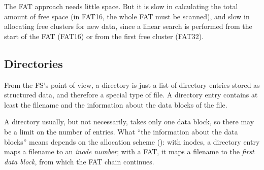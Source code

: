 The FAT approach needs little space. But it is slow in calculating the total amount of free space (in FAT16, the whole FAT must be scanned), and slow in allocating free clusters for new data, since a linear search is performed from the start of the FAT (FAT16) or from the first free cluster (FAT32).

\subsection{Directories}

\begin{definition}
  From the FS's point of view, a directory is just a list of directory entries stored as structured data, and therefore a special type of file. A directory entry contains at least the filename and the information about the data blocks of the file.
\end{definition}

A directory usually, but not necessarily, takes only one data block, so there may be a limit on the number of entries. What ``the information about the data blocks'' means depends on the allocation scheme (): with inodes, a directory entry maps a filename to an \emph{inode number}; with a FAT, it maps a filename to the \emph{first data block}, from which the FAT chain continues.

